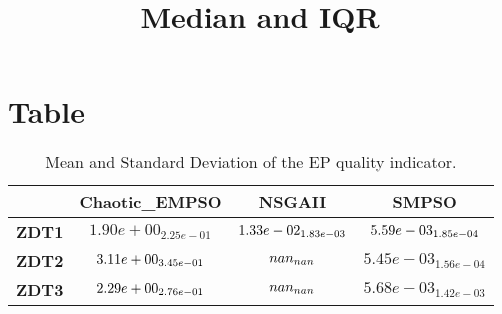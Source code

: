 \documentclass{article}
\title{Median and IQR}
\author{}
\begin{document}
\maketitle
\section{Table}
\begin{table}[!htp]
  \caption{Mean and Standard Deviation of the EP quality indicator.}
  \label{table:EP}
  \centering
  \begin{scriptsize}
  \begin{tabular}{c|ccc}
      & \textbf{Chaotic\_EMPSO} & \textbf{NSGAII} & \textbf{SMPSO} \\\hline
      \textbf{ZDT1} & $1.90e+00_{2.25e-01} $ & $ \cellcolor{gray25} 1.33e-02_{1.83e-03} $ & $ \cellcolor{gray95} 5.59e-03_{1.85e-04}$ \\
      \textbf{ZDT2} & $\cellcolor{gray95} 3.11e+00_{3.45e-01} $ & $ \cellcolor{gray25} nan_{nan} $ & $ 5.45e-03_{1.56e-04}$ \\
      \textbf{ZDT3} & $\cellcolor{gray95} 2.29e+00_{2.76e-01} $ & $ \cellcolor{gray25} nan_{nan} $ & $ 5.68e-03_{1.42e-03}$ \\
  \end{tabular}
  \end{scriptsize}
\end{table}
\end{document}
